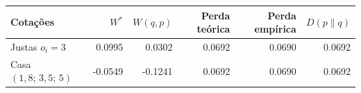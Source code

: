 \begin{tabular}{lrrrrr}
\toprule
Cotações & $W^*$ & $W(q,p)$ & Perda teórica & Perda empírica & $D(p\|q)$ \\
\midrule
Justas $o_i=3$ & 0.0995 & 0.0302 & 0.0692 & 0.0690 & 0.0692 \\
Casa $(1{,}8;\,3{,}5;\,5)$ & -0.0549 & -0.1241 & 0.0692 & 0.0690 & 0.0692 \\
\bottomrule
\end{tabular}
